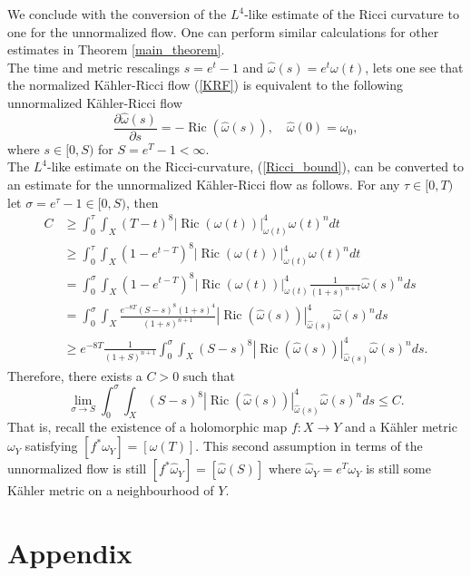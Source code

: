 \documentclass[12pt]{article}
\numberwithin{equation}{section}
\renewcommand{\d}{\partial}
\DeclareMathOperator{\Ric}{Ric}
\begin{document}
\noindent We conclude with the conversion of the $L^4$-like estimate of the Ricci curvature to one for the unnormalized flow. One can perform similar calculations for other estimates in Theorem \ref{main_theorem}.\\

\noindent The time and metric rescalings $s = e^t-1$ and $\hat{\omega}(s) = e^t \omega(t)$, lets one see that the normalized K\"ahler-Ricci flow (\ref{KRF}) is equivalent to the following unnormalized K\"ahler-Ricci flow
\begin{equation}\label{UKRF}\tag{UKRF}
    \frac{\d \hat{\omega}(s)}{\d s} = -\Ric(\hat{\omega}(s)), \quad \hat{\omega}(0) = \omega_0,
\end{equation}
where $s \in [0,S)$ for $S = e^T-1 < \infty$.\\
The $L^4$-like estimate on the Ricci-curvature, (\ref{Ricci_bound}), can be converted to an estimate for the unnormalized K\"ahler-Ricci flow as follows. For any $\tau \in [0,T)$ let $\sigma = e^\tau-1 \in [0,S)$, then
\begin{align*}
    C &\geq \int_0^\tau \int_X (T-t)^8 |\Ric (\omega(t))|^4_{\omega(t)} \omega(t)^n dt\\
    &\geq \int_0^\tau \int_X (1-e^{t-T})^8 |\Ric (\omega(t))|^4_{\omega(t)} \omega(t)^n dt\\
    &= \int_0^\sigma \int_X (1-e^{t-T})^8 |\Ric (\omega(t))|^4_{\omega(t)} \frac{1}{(1+s)^{n+1}} \hat{\omega}(s)^n ds\\
    &= \int_0^\sigma \int_X \frac{e^{-8T}(S-s)^8(1+s)^4}{(1+s)^{n+1}} |\Ric (\hat{\omega}(s))|^4_{\hat{\omega}(s)} \hat{\omega}(s)^n ds\\
    &\geq e^{-8T}\frac{1}{(1+S)^{n+1}} \int_0^\sigma \int_X (S-s)^8 |\Ric (\hat{\omega}(s))|_{\hat{\omega}(s)}^4 \hat{\omega}(s)^n ds.
\end{align*}
Therefore, there exists a $C > 0$ such that
\begin{equation*}
    \lim_{\sigma \to S} \int_0^\sigma \int_X (S-s)^8 |\Ric (\hat{\omega}(s))|_{\hat{\omega}(s)}^4 \hat{\omega}(s)^n ds \leq C.
\end{equation*}
That is, recall the existence of a holomorphic map $f: X \to Y$ and a K\"ahler metric $\omega_Y$ satisfying $[f^*\omega_Y] = [\omega(T)]$. This second assumption in terms of the unnormalized flow is still $[f^*\hat{\omega}_Y] = [\hat{\omega}(S)]$ where $\hat{\omega}_Y = e^T \omega_Y$ is still some K\"ahler metric on a neighbourhood of $Y$.

\section{Appendix}
\end{document}
